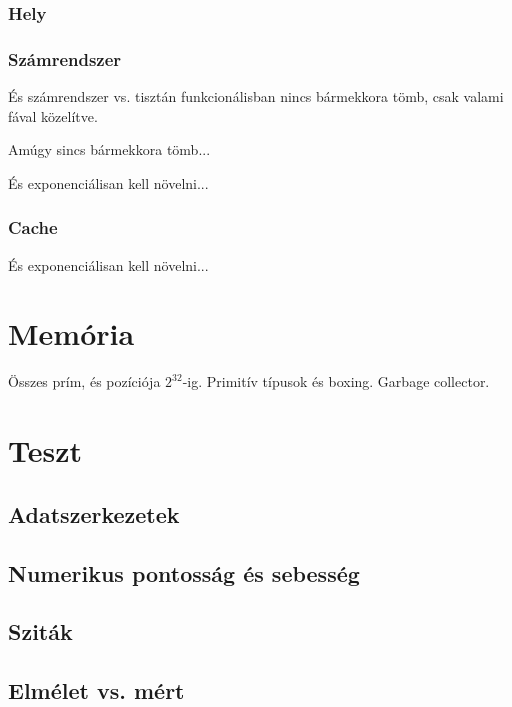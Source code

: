 \subsubsection{Hely}

\subsubsection{Számrendszer}

És számrendszer vs. tisztán funkcionálisban nincs bármekkora tömb, csak valami fával közelítve.

Amúgy sincs bármekkora tömb...

És exponenciálisan kell növelni...

\subsubsection{Cache}

És exponenciálisan kell növelni...

\section{Memória}

Összes prím, és pozíciója $2^32$-ig. Primitív típusok és boxing. Garbage collector.

\section{Teszt}

\subsection{Adatszerkezetek}

\subsection{Numerikus pontosság és sebesség}

\subsection{Sziták}

\subsection{Elmélet vs. mért}
